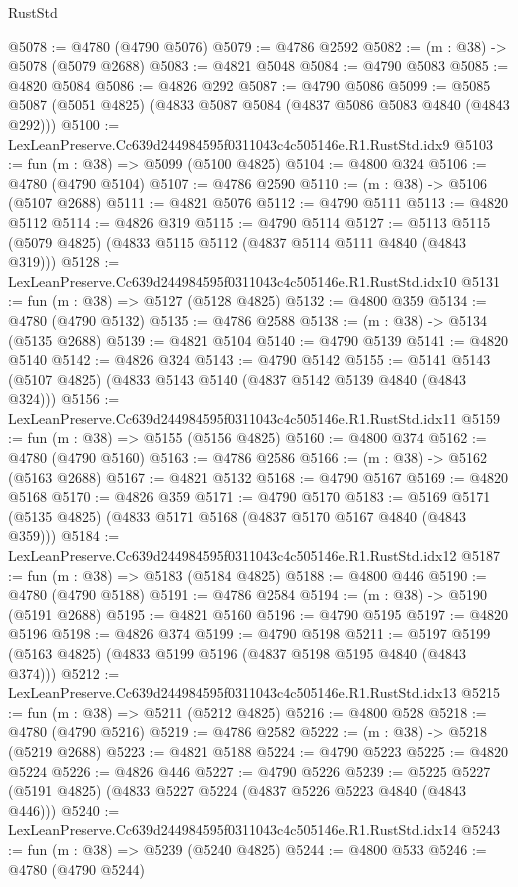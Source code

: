 \begin{lexlean}{RustStd}
\begin{coremodule}
@5078 := @4780 (@4790 @5076)
@5079 := @4786 @2592
@5082 := (m : @38) -> @5078 (@5079 @2688)
@5083 := @4821 @5048
@5084 := @4790 @5083
@5085 := @4820 @5084
@5086 := @4826 @292
@5087 := @4790 @5086
@5099 := @5085 @5087 (@5051 @4825) (@4833 @5087 @5084 (@4837 @5086 @5083 @4840 (@4843 @292)))
@5100 := LexLeanPreserve.Cc639d244984595f0311043c4c505146e.R1.RustStd.idx9
@5103 := fun (m : @38) => @5099 (@5100 @4825)
@5104 := @4800 @324
@5106 := @4780 (@4790 @5104)
@5107 := @4786 @2590
@5110 := (m : @38) -> @5106 (@5107 @2688)
@5111 := @4821 @5076
@5112 := @4790 @5111
@5113 := @4820 @5112
@5114 := @4826 @319
@5115 := @4790 @5114
@5127 := @5113 @5115 (@5079 @4825) (@4833 @5115 @5112 (@4837 @5114 @5111 @4840 (@4843 @319)))
@5128 := LexLeanPreserve.Cc639d244984595f0311043c4c505146e.R1.RustStd.idx10
@5131 := fun (m : @38) => @5127 (@5128 @4825)
@5132 := @4800 @359
@5134 := @4780 (@4790 @5132)
@5135 := @4786 @2588
@5138 := (m : @38) -> @5134 (@5135 @2688)
@5139 := @4821 @5104
@5140 := @4790 @5139
@5141 := @4820 @5140
@5142 := @4826 @324
@5143 := @4790 @5142
@5155 := @5141 @5143 (@5107 @4825) (@4833 @5143 @5140 (@4837 @5142 @5139 @4840 (@4843 @324)))
@5156 := LexLeanPreserve.Cc639d244984595f0311043c4c505146e.R1.RustStd.idx11
@5159 := fun (m : @38) => @5155 (@5156 @4825)
@5160 := @4800 @374
@5162 := @4780 (@4790 @5160)
@5163 := @4786 @2586
@5166 := (m : @38) -> @5162 (@5163 @2688)
@5167 := @4821 @5132
@5168 := @4790 @5167
@5169 := @4820 @5168
@5170 := @4826 @359
@5171 := @4790 @5170
@5183 := @5169 @5171 (@5135 @4825) (@4833 @5171 @5168 (@4837 @5170 @5167 @4840 (@4843 @359)))
@5184 := LexLeanPreserve.Cc639d244984595f0311043c4c505146e.R1.RustStd.idx12
@5187 := fun (m : @38) => @5183 (@5184 @4825)
@5188 := @4800 @446
@5190 := @4780 (@4790 @5188)
@5191 := @4786 @2584
@5194 := (m : @38) -> @5190 (@5191 @2688)
@5195 := @4821 @5160
@5196 := @4790 @5195
@5197 := @4820 @5196
@5198 := @4826 @374
@5199 := @4790 @5198
@5211 := @5197 @5199 (@5163 @4825) (@4833 @5199 @5196 (@4837 @5198 @5195 @4840 (@4843 @374)))
@5212 := LexLeanPreserve.Cc639d244984595f0311043c4c505146e.R1.RustStd.idx13
@5215 := fun (m : @38) => @5211 (@5212 @4825)
@5216 := @4800 @528
@5218 := @4780 (@4790 @5216)
@5219 := @4786 @2582
@5222 := (m : @38) -> @5218 (@5219 @2688)
@5223 := @4821 @5188
@5224 := @4790 @5223
@5225 := @4820 @5224
@5226 := @4826 @446
@5227 := @4790 @5226
@5239 := @5225 @5227 (@5191 @4825) (@4833 @5227 @5224 (@4837 @5226 @5223 @4840 (@4843 @446)))
@5240 := LexLeanPreserve.Cc639d244984595f0311043c4c505146e.R1.RustStd.idx14
@5243 := fun (m : @38) => @5239 (@5240 @4825)
@5244 := @4800 @533
@5246 := @4780 (@4790 @5244)

\end{coremodule}
\end{lexlean}
